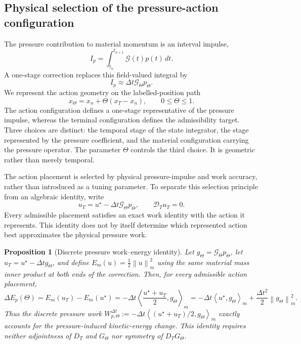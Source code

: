 \documentclass[11pt]{article}
\theoremstyle{plain}
\newtheorem{proposition}[theorem]{Proposition}
\theoremstyle{definition}
\theoremstyle{remark}
\newcommand{\D}{\mathcal{D}}
\newcommand{\G}{\mathcal{G}}
\newcommand{\dt}{\Delta t}
\newcommand{\Th}{\Theta}
\newcommand{\half}{\tfrac12}
\newcommand{\norm}[2][]{\left\lVert #2\right\rVert_{#1}}
\newcommand{\ip}[3][]{\left\langle #2,#3\right\rangle_{#1}}
\begin{document}
\subsection{Physical selection of the pressure-action configuration}
\label{sec:finite_step_action_work}

The pressure contribution to material momentum is an interval impulse,
\begin{equation}
  I_p=\int_{t_n}^{t_{n+1}}\G(t)p(t)\,dt.
  \label{eq:exact_pressure_impulse}
\end{equation}
A one-stage correction replaces this field-valued integral by
\begin{equation}
  I_p\approx\dt\G_\Th p_\Th.
  \label{eq:placed_pressure_impulse}
\end{equation}
We represent the action geometry on the labelled-position path
\begin{equation}
  x_\Th=x_n+\Th(x_T-x_n),\qquad 0\le\Th\le1.
  \label{eq:linear_action_path}
\end{equation}
The action configuration defines a one-stage representative of the pressure
impulse, whereas the terminal configuration defines the admissibility target.
Three choices are distinct: the temporal stage of the state integrator, the
stage represented by the pressure coefficient, and the material configuration
carrying the pressure operator.  The parameter $\Th$ controls the third choice.
It is geometric rather than merely temporal.

The action placement is selected by physical pressure-impulse and work
accuracy, rather than introduced as a tuning parameter.  To separate this
selection principle from an algebraic identity, write
\begin{equation}
  u_T=u^\star-\dt\G_\Th p_\Th,
  \qquad \D_Tu_T=0.
  \label{eq:terminal_action_step_continuum}
\end{equation}
Every admissible placement satisfies an exact work identity with the action it
represents.  This identity does not by itself determine which represented
action best approximates the physical pressure work.

\begin{proposition}[Discrete pressure work--energy identity]
\label{prop:discrete_pressure_work_energy}
Let $g_\Th=\G_\Th p_\Th$, let
$u_T=u^\star-\dt g_\Th$, and define
$E_m(u)=\half\norm[m]{u}^2$ using the same material mass inner product at both
ends of the correction.  Then, for every admissible action placement,
\begin{equation}
 \Delta E_p(\Th)
 =E_m(u_T)-E_m(u^\star)
 =-\dt\ip[m]{\frac{u^\star+u_T}{2}}{g_\Th}
 =-\dt\ip[m]{u^\star}{g_\Th}
  +\frac{\dt^2}{2}\norm[m]{g_\Th}^2.
 \label{eq:discrete_pressure_work_energy}
\end{equation}
Thus the discrete pressure work
$W_{p,\Th}^{\dt}:=-\dt\ip[m]{(u^\star+u_T)/2}{g_\Th}$ exactly accounts for
the pressure-induced kinetic-energy change.  This identity requires neither
adjointness of $D_T$ and $G_\Th$ nor symmetry of $D_TG_\Th$.
\end{proposition}
\end{document}
